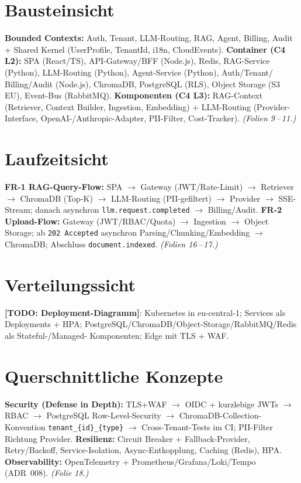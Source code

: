 \documentclass[11pt,a4paper]{article}
\newcommand{\todo}[1]{\textcolor{bad}{\textbf{[TODO: #1]}}}
\begin{document}
\section{Bausteinsicht }
\textbf{Bounded Contexts:} Auth, Tenant, LLM-Routing, RAG, Agent, Billing, Audit +
Shared Kernel (UserProfile, TenantId, i18n, CloudEvents).
\textbf{Container (C4 L2):} SPA (React/TS), API-Gateway/BFF (Node.js), Redis,
RAG-Service (Python), LLM-Routing (Python), Agent-Service (Python), Auth/Tenant/
Billing/Audit (Node.js), ChromaDB, PostgreSQL (RLS), Object Storage (S3 EU),
Event-Bus (RabbitMQ).
\textbf{Komponenten (C4 L3):} RAG-Context (Retriever, Context Builder, Ingestion,
Embedding) + LLM-Routing (Provider-Interface, OpenAI-/Anthropic-Adapter, PII-Filter,
Cost-Tracker). \emph{(Folien 9\,--\,11.)}

\section{Laufzeitsicht }
\textbf{FR-1 RAG-Query-Flow:} SPA $\rightarrow$ Gateway (JWT/Rate-Limit) $\rightarrow$
Retriever $\rightarrow$ ChromaDB (Top-K) $\rightarrow$ LLM-Routing (PII-gefiltert)
$\rightarrow$ Provider $\rightarrow$ SSE-Stream; danach asynchron
\texttt{llm.request.completed} $\rightarrow$ Billing/Audit.
\textbf{FR-2 Upload-Flow:} Gateway (JWT/RBAC/Quota) $\rightarrow$ Ingestion
$\rightarrow$ Object Storage; ab \texttt{202~Accepted} asynchron
Parsing/Chunking/Embedding $\rightarrow$ ChromaDB; Abschluss
\texttt{document.indexed}. \emph{(Folien 16\,--\,17.)}

\section{Verteilungssicht }
\todo{Deployment-Diagramm}: Kubernetes in eu-central-1; Services als Deployments +
HPA; PostgreSQL/ChromaDB/Object-Storage/RabbitMQ/Redis als Stateful-/Managed-
Komponenten; Edge mit TLS + WAF.

\section{Querschnittliche Konzepte }
\textbf{Security (Defense in Depth):} TLS+WAF $\rightarrow$ OIDC + kurzlebige JWTs
$\rightarrow$ RBAC $\rightarrow$ PostgreSQL Row-Level-Security $\rightarrow$
ChromaDB-Collection-Konvention \texttt{tenant\_\{id\}\_\{type\}} $\rightarrow$
Cross-Tenant-Tests im CI; PII-Filter Richtung Provider.
\textbf{Resilienz:} Circuit Breaker + Fallback-Provider, Retry/Backoff,
Service-Isolation, Async-Entkopplung, Caching (Redis), HPA.
\textbf{Observability:} OpenTelemetry + Prometheus/Grafana/Loki/Tempo (ADR~008).
\emph{(Folie 18.)}
\end{document}
